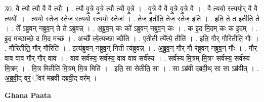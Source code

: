 \documentclass[17pt]{extarticle}
\begin{document}
30. वै त्यौ त्यौ वै वै त्यौ । . त्यौ वृ॒त्रे वृ॒त्रे त्यौ त्यौ वृ॒त्रे । . वृ॒त्रे वै वै वृ॒त्रे वृ॒त्रे वै । . वै त्ययो॒ स्त्ययो॒र् वै वै त्ययोः᳚ । . त्ययो॒ स्तेज॒ स्तेज॒ स्त्ययो॒ स्त्ययो॒ स्तेजः॑ । . तेज॒ इतीति॒ तेज॒ स्तेज॒ इति॑ । . इति॒ ते त इतीति॒ ते । . ते᳚ ऽब्रुवन् नब्रुव॒न् ते ते᳚ ऽब्रुवन्न् । . अ॒ब्रु॒व॒न् कः को᳚ ऽब्रुवन् नब्रुव॒न् कः । . क इ॒द मि॒दम् कः क इ॒दम् । . इ॒द मच्छाच्छे॒ द मि॒द मच्छ॑ । . अच्छै᳚ त्ये॒त्यच्छा च्छै॑ति । . ए॒तीती त्ये᳚त्ये॒ तीति॑ । . इति॒ गौर् गौरितीति॒ गौः । . गौरितीति॒ गौर् गौरिति॑ । . इत्य॑ब्रुवन् नब्रुव॒न् निती त्य॑ब्रुवन्न् । . अ॒ब्रु॒व॒न् गौर् गौ र॑ब्रुवन् नब्रुव॒न् गौः । . गौर् वाव वाव गौर् गौर् वाव । . वाव सर्व॑स्य॒ सर्व॑स्य॒ वाव वाव सर्व॑स्य । . सर्व॑स्य मि॒त्रम् मि॒त्रꣳ सर्व॑स्य॒ सर्व॑स्य मि॒त्रम् । . मि॒त्र मितीति॑ मि॒त्रम् मि॒त्र मिति॑ । . इति॒ सा सेतीति॒ सा । . सा ऽब्र॑वी दब्रवी॒थ् सा सा ऽब्र॑वीत् । . अ॒ब्र॒वी॒द् वरं॒ ॅवर॑ मब्रवी दब्रवी॒द् वर᳚म् । \newline

\textbf{Ghana Paata } \newline
\end{document}
